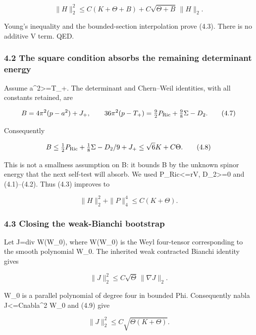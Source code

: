 \documentclass[
  10pt,
]{article}
\begin{document}
\[
 \|H\|_2^2\le C(K+\Theta+B)
                 +C\sqrt{\Theta+B}\,\|H\|_2.
\]

Young's inequality and the bounded-section interpolation prove (4.3).
There is no additive V term. QED.

\hypertarget{the-square-condition-absorbs-the-remaining-determinant-energy}{%
\subsubsection{4.2 The square condition absorbs the remaining
determinant
energy}\label{the-square-condition-absorbs-the-remaining-determinant-energy}}

Assume a\^{}2\textgreater=T\_+. The determinant and Chern--Weil
identities, with all constants retained, are

\[
 B=4\pi^2(p-a^2)+J_+,
 \qquad
 36\pi^2(p-T_+)=\tfrac92P_{\rm Ric}+\tfrac98\Sigma-D_2.
                                                               \tag{4.7}
\]

Consequently

\[
 B\le\tfrac12P_{\rm Ric}+\tfrac18\Sigma-D_2/9+J_+
       \le\sqrt6 K+C\Theta.                          \tag{4.8}
\]

This is not a smallness assumption on B: it bounds B by the unknown
spinor energy that the next self-test will absorb. We used
P\_Ric\textless=rV, D\_2\textgreater=0 and (4.1)--(4.2). Thus (4.3)
improves to

\[
             \|H\|_2^2+\|P\|_4^4\le C(K+\Theta).   \tag{4.9}
\]

\hypertarget{closing-the-weak-bianchi-bootstrap}{%
\subsubsection{4.3 Closing the weak-Bianchi
bootstrap}\label{closing-the-weak-bianchi-bootstrap}}

Let J=div W(W\_0), where W(W\_0) is the Weyl four-tensor corresponding
to the smooth polynomial W\_0. The inherited weak contracted Bianchi
identity gives

\[
 \|J\|_2^2\le C\sqrt\Theta\,\|\nabla J\|_2.
\]

W\_0 is a parallel polynomial of degree four in bounded Phi.
Consequently \textbar nabla J\textbar\textless=C\textbar nabla\^{}2
W\_0\textbar{} and (4.9) give

\[
                    \|J\|_2^2\le C\sqrt{\Theta(K+\Theta)}.
                                                               \tag{4.10}
\]
\end{document}
